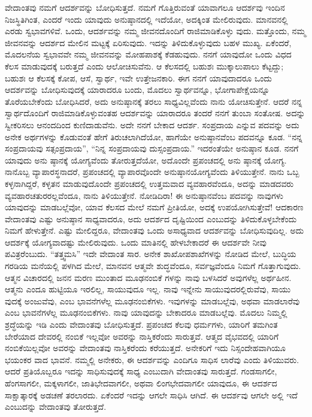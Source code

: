 ವೇದಾಂತವು ನಮಗೆ ಆದರ್ಶವನ್ನು ಬೋಧಿಸುತ್ತದೆ. ನಮಗೆ ಗೊತ್ತಿರುವಂತೆ ಯಾವಾಗಲೂ ಆದರ್ಶವು ಇಂದಿನ ನಿಜಸ್ಥಿತಿಗಿಂತ, ಎಂದರೆ ಇಂದು ಯಾವುದು ಅನುಷ್ಠಾನದಲ್ಲಿ ಇದೆಯೋ, ಅದಕ್ಕಿಂತ ಮೇಲಿರುವುದು. ಮಾನವನಲ್ಲಿ ಎರಡು ಸ್ವಭಾವಗಳಿವೆ. ಒಂದು, ಆದರ್ಶವನ್ನು ನಮ್ಮ ಜೀವನದೊಂದಿಗೆ ರಾಜಿಮಾಡಿಕೊಳ್ಳು ವುದು. ಮತ್ತೊಂದು, ನಮ್ಮ ಜೀವನವನ್ನು ಆದರ್ಶದ ಮೇಲಿನ ಮಟ್ಟಕ್ಕೆ ಏರಿಸುವುದು. ಇದನ್ನು ತಿಳಿದುಕೊಳ್ಳುವುದು ಬಹಳ ಮುಖ್ಯ. ಏಕೆಂದರೆ, ಮೊದಲನೆಯ ಸ್ವಭಾವವೇ ನಮ್ಮ ಜೀವನವನ್ನು ಮೋಹಪಾಶಕ್ಕೆ ಕೆಡಹುವುದು. ನನಗೆ ಯಾವುದೋ ಒಂದು ವಿಧದ ಕೆಲಸ ಮಾಡುವುದಕ್ಕೆ ಬರುತ್ತದೆ ಎಂದು ಆಲೋಚಿಸುವೆನು. ಆ ಕೆಲಸದಲ್ಲಿ ಬಹುಶಃ ಮುಕ್ಕಾಲುಪಾಲು ಕೆಟ್ಟದ್ದು; ಬಹುಶಃ ಆ ಕೆಲಸಕ್ಕೆ ಕೋಪ, ಆಸೆ, ಸ್ವಾರ್ಥ, ಇವೇ ಉತ್ತೇಜನಕಾರಿ. ಈಗ ನನಗೆ ಯಾವುದಾದರೂ ಒಂದು ಆದರ್ಶವನ್ನು ಬೋಧಿಸುವುದಕ್ಕೆ ಯಾರಾದರೂ ಬಂದು, ಮೊದಲು ಸ್ವಾರ್ಥವನ್ನೂ, ಭೋಗಾಪೇಕ್ಷೆಯನ್ನೂ ತೊರೆಯಬೇಕೆಂದು ಬೋಧಿಸಿದರೆ, ಅದು ಅನುಷ್ಠಾನಕ್ಕೆ ತರಲು ಸಾಧ್ಯವಿಲ್ಲವೆಂದು ನಾನು ಯೋಚಿಸುತ್ತೇನೆ. ಆದರೆ ನನ್ನ ಸ್ವಾರ್ಥದೊಂದಿಗೆ ರಾಜಿಮಾಡಿಕೊಳ್ಳುವಂತಹ ಆದರ್ಶವನ್ನು ಯಾರಾದರೂ ತಂದರೆ ನನಗೆ ತುಂಬಾ ಸಂತೋಷ. ಅದನ್ನು ಸ್ವೀಕರಿಸಲು ಆನಂದದಿಂದ ಕುಣಿದಾಡುವೆನು. ಅದೇ ನನಗೆ ಬೇಕಾದ ಆದರ್ಶ. ಸಂಪ್ರದಾಯ ಎನ್ನುವ ಪದವನ್ನು ಅದು ಅನೇಕ ಅರ್ಥಗಳನ್ನು ಕೊಡುವಂತೆ ಹೇಗೆ ತಿರುಚಲಾಗಿದೆಯೋ, ಹಾಗೆಯೇ ಅನುಷ್ಠಾನವೆಂಬ ಪದವನ್ನೂ ಕೂಡ. “ನನ್ನ ಸಂಪ್ರದಾಯವು ಸತ್ಸಂಪ್ರದಾಯ”, “ನಿನ್ನ ಸಂಪ್ರದಾಯವು ದುಸ್ಸಂಪ್ರದಾಯ.” ಇದರಂತೆಯೇ ಅನುಷ್ಠಾನ ಕೂಡ. ನನಗೆ ಯಾವುದು ಅನು ಷ್ಠಾನಕ್ಕೆ ಯೋಗ್ಯವೆಂದು ತೋರುತ್ತದೆಯೋ, ಅದೊಂದೇ ಪ್ರಪಂಚದಲ್ಲಿ ಅನು ಷ್ಠಾನಕ್ಕೆ ಯೋಗ್ಯ. ನಾನೊಬ್ಬ ವ್ಯಾಪಾರಸ್ಥನಾದರೆ, ಪ್ರಪಂಚದಲ್ಲಿ ವ್ಯಾಪಾರವೊಂದೇ ಅನುಷ್ಠಾನಯೋಗ್ಯವೆಂದು ತಿಳಿಯುತ್ತೇನೆ. ನಾನು ಒಬ್ಬ ಕಳ್ಳನಾಗಿದ್ದರೆ, ಕಳ್ಳತನ ಮಾಡುವುದೊಂದೇ ಪ್ರಪಂಚದಲ್ಲಿ ಉತ್ತಮವಾದ ವ್ಯವಹಾರವೆಂದೂ, ಅದನ್ನು ಮಾಡದವರು ವ್ಯವಹಾರಚತುರರಲ್ಲವೆಂದೂ, ನಾನು ತಿಳಿಯುತ್ತೇನೆ. ನೋಡಿದಿರಾ! ಈ ಅನುಷ್ಠಾನವೆಂಬ ಪದವನ್ನು ನಾವುಗಳು ಯಾವುದನ್ನು ಮಾಡಬಲ್ಲೆವೋ, ಯಾವ ಕೆಲಸದ ಮೇಲೆ ನಮಗೆ ಪ್ರೀತಿಯೋ, ಅದಕ್ಕೆ ಉಪಯೋಗಿಸುತ್ತೇವೆ! ಆದಕಾರಣ ವೇದಾಂತವು ಎಷ್ಟು ಅನುಷ್ಠಾನ ಸಾಧ್ಯವಾದರೂ, ಅದು ಆದರ್ಶದ ದೃಷ್ಟಿಯಿಂದ ಎಂಬುದನ್ನು ತಿಳಿದುಕೊಳ್ಳಬೇಕೆಂದು ನಿಮಗೆ ಹೇಳುತ್ತೇನೆ. ಎಷ್ಟು ಮೇಲಿದ್ದರೂ, ವೇದಾಂತವು ಒಂದು ಅಸಾಧ್ಯವಾದ ಆದರ್ಶವನ್ನು ಬೋಧಿಸುವುದಿಲ್ಲ. ಅದು ಆದರ್ಶಕ್ಕೆ ಯೋಗ್ಯವಾದಷ್ಟು ಮೇಲಿರುವುದು. ಒಂದು ಮಾತಿನಲ್ಲಿ ಹೇಳಬೇಕಾದರೆ ಈ ಆದರ್ಶವೇ ನೀವು ಪವಿತ್ರರೆಂಬುದು. “ತತ್ತ್ವಮಸಿ” ಇದೇ ವೇದಾಂತ ಸಾರ. ಅನೇಕ ಶಾಖೋಪಶಾಖೆಗಳನ್ನು ನೋಡಿದ ಮೇಲೆ, ಬುದ್ಧಿಯ ಗರಡಿಯ ಮನೆಯಲ್ಲಿ ಪಳಗಿದ ಮೇಲೆ, ಮಾನವನ ಆತ್ಮವೇ ಶುದ್ಧವೆಂದೂ, ಸರ್ವಜ್ಞವೆಂದೂ ನಿಮಗೆ ಗೊತ್ತಾಗುವುದು. ಆತ್ಮನ ವಿಚಾರದಲ್ಲಿ ಜನನ ಮರಣ ಮುಂತಾದ ಮೂಢನಂಬಿಕೆ ಗಳನ್ನು ನಾವು ಬಳಸಿದರೆ ಅವುಗಳೆಲ್ಲ ಅರ್ಥಹೀನ. ಆತ್ಮನು ಎಂದೂ ಹುಟ್ಟಿಯೂ ಇರಲಿಲ್ಲ, ಸಾಯುವುದೂ ಇಲ್ಲ. ನಾವು ಇನ್ನೇನು ಸಾಯುವುದರಲ್ಲಿರುವೆವು, ಸಾಯು ವುದಕ್ಕೆ ಅಂಜುವೆವು, ಎಂಬ ಭಾವನೆಗಳೆಲ್ಲ ಮೂಢನಂಬಿಕೆಗಳು. ಇವುಗಳನ್ನು ಮಾಡಬಲ್ಲೆವು, ಅಥವಾ ಮಾಡಲಾರೆವು ಎಂಬ ಭಾವನೆಗಳೆಲ್ಲ ಮೂಢನಂಬಿಕೆಗಳು. ನಾವು ಯಾವುದನ್ನು ಬೇಕಾದರೂ ಮಾಡಬಲ್ಲೆವು. ಮೊದಲು ನಿಮ್ಮಲ್ಲಿ ಶ್ರದ್ಧೆಯನ್ನು ಇಡಿ ಎಂದು ವೇದಾಂತವು ಬೋಧಿಸುತ್ತದೆ. ಪ್ರಪಂಚದ ಕೆಲವು ಧರ್ಮಗಳು, ಯಾರಿಗೆ ತಮಗಿಂತ ಬೇರೆಯಾದ ದೇವರಲ್ಲಿ ನಂಬಿಕೆ ಇಲ್ಲವೋ ಅವರನ್ನು ನಾಸ್ತಿಕರೆಂದು ಸಾರುತ್ತವೆ. ಆತ್ಮದ ವೈಭವದಲ್ಲಿ ಯಾರಿಗೆ ನಂಬಿಕೆಯಿಲ್ಲವೋ ಅವರನ್ನು ವೇದಾಂತವು ನಾಸ್ತಿಕರೆಂದು ಕರೆಯುತ್ತದೆ. ಅನೇಕರಿಗೆ ಇದು ನಿಸ್ಸಂದೇಹವಾಗಿಯೂ ಭಯಂಕರ ವಾದ ಭಾವನೆ. ನಮ್ಮಲ್ಲಿ ಅನೇಕರು, ಈ ಆದರ್ಶವನ್ನು ಎಂದಿಗೂ ಸಾಧಿಸ ಲಾರೆವು ಎಂದು ತಿಳಿಯುವರು. ಆದರೆ ಪ್ರತಿಯೊಬ್ಬರೂ ಇದನ್ನು ಸಾಧಿಸುವುದಕ್ಕೆ ಸಾಧ್ಯ ಎಂಬುದಾಗಿ ವೇದಾಂತವು ಸಾರುತ್ತದೆ. ಗಂಡಸಾಗಲೀ, ಹೆಂಗಸಾಗಲೀ, ಮಕ್ಕಳಾಗಲೀ, ಜಾತಿಭೇದವಾಗಲೀ, ಅಥವಾ ಲಿಂಗಭೇದವಾಗಲೀ ಯಾವುದೂ, ಈ ಆದರ್ಶದ ಸಾಕ್ಷಾತ್ಕಾರಕ್ಕೆ ಅಡಚಣೆ ತರಲಾರದು. ಏಕೆಂದರೆ ಇದನ್ನು ಆಗಲೇ ಸಾಧಿಸಿ ಆಗಿದೆ. ಈ ಆದರ್ಶವು ಆಗಲೇ ಅಲ್ಲಿ ಇದೆ ಎಂಬುದನ್ನು ವೇದಾಂತವು ತೋರುತ್ತದೆ.

